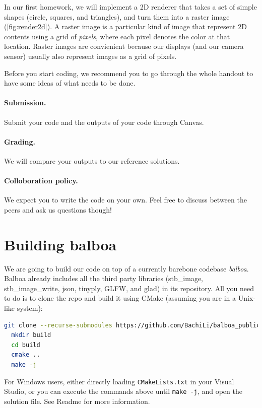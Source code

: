 In our first homework, we will implement a 2D renderer that takes a set of simple shapes (circle, squares, and triangles), and turn them into a raster image (\cref{fig:render2d}). A raster image is a particular kind of image that represent 2D contents using a grid of \emph{pixels}, where each pixel denotes the color at that location. Raster images are convienient because our displays (and our camera sensor) usually also represent images as a grid of pixels.

Before you start coding, we recommend you to go through the whole handout to have some ideas of what needs to be done.

\paragraph{Submission.} Submit your code and the outputs of your code through Canvas.

\paragraph{Grading.} We will compare your outputs to our reference solutions.

\paragraph{Colloboration policy.} We expect you to write the code on your own. Feel free to discuss between the peers and ask us questions though!

\section{Building balboa}

We are going to build our code on top of a currently barebone codebase \emph{balboa}. Balboa already includes all the third party libraries (stb\_image, stb\_image\_write, json, tinyply, GLFW, and glad) in its repository.
All you need to do is to clone the repo and build it using CMake (assuming you are in a Unix-like system):
\begin{lstlisting}[language=bash]
  git clone --recurse-submodules https://github.com/BachiLi/balboa_public
  mkdir build
  cd build
  cmake ..
  make -j
\end{lstlisting}
For Windows users, either directly loading \lstinline{CMakeLists.txt} in your Visual Studio, or you can execute the commands above until \lstinline{make -j}, and open the solution file. See Readme for more information.


